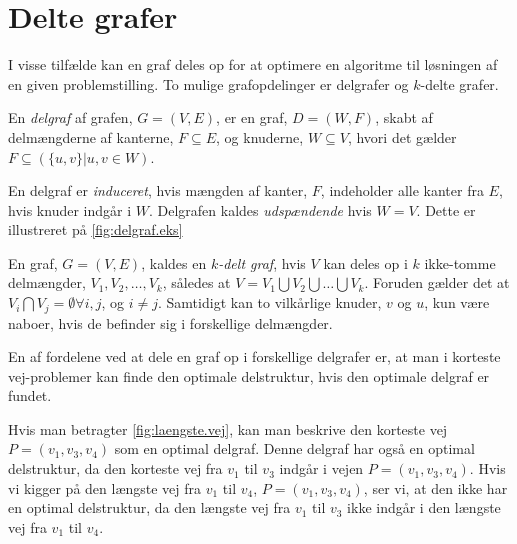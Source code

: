 \section{Delte grafer}
I visse tilfælde kan en graf deles op for at optimere en algoritme til løsningen af en given problemstilling.
To mulige grafopdelinger er delgrafer og $k$-delte grafer.

\begin{defn}[Delgraf] \label{defn:delgraf} %
En \emph{delgraf} af grafen, $G= (V,E)$, er en graf, $D = (W,F)$, skabt af delmængderne af kanterne, $F \subseteq E$, og knuderne, $W \subseteq V$, hvori det gælder $F \subseteq (\{u,v\} | u,v \in W)$.
\end{defn}

En delgraf er \emph{induceret}, hvis mængden af kanter, $F$, indeholder alle kanter fra $E$, hvis knuder indgår i $W$.
Delgrafen kaldes \emph{udspændende} hvis $W=V$. Dette er illustreret på \autoref{fig:delgraf.eks}



\begin{defn} \label{defn:k-delt} %
En graf, $G = (V, E)$, kaldes en \emph{$k$-delt graf}, hvis $V$ kan deles op i $k$ ikke-tomme delmængder, $V_1, V_2,\dotsc, V_k$, således at $V = V_1 \bigcup V_2 \bigcup \dotsc \bigcup V_k$. Foruden gælder det at $V_i \bigcap V_j  = \emptyset \forall i,j$, og $i\neq j$. Samtidigt kan to vilkårlige knuder, $v$ og $u$, kun være naboer, hvis de befinder sig i forskellige delmængder. 
\end{defn}


En af fordelene ved at dele en graf op i forskellige delgrafer er, at man i korteste vej-problemer kan finde den optimale delstruktur, hvis den optimale delgraf er fundet. 

Hvis man betragter \autoref{fig:laengste.vej}, kan man beskrive den korteste vej $P=(v_1,v_3,v_4)$ som en optimal delgraf. Denne delgraf har også en optimal delstruktur, da den korteste vej fra $v_1$ til $v_3$ indgår i vejen $P=(v_1,v_3,v_4)$.
Hvis vi kigger på den længste vej fra $v_1$ til $v_4$, $P=(v_1,v_3,v_4)$, ser vi, at den ikke har en optimal delstruktur, da den længste vej fra $v_1$ til $v_3$ ikke indgår i den længste vej fra $v_1$ til $v_4$.








